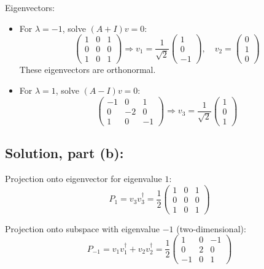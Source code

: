 \documentclass[12pt]{article}
\begin{document}
        Eigenvectors:
        \begin{itemize}
            \item For \(\lambda=-1\), solve \((A+I)v=0\):
        \[
        \begin{pmatrix}
        1 & 0 & 1\\[4pt]
        0 & 0 & 0\\[4pt]
        1 & 0 & 1
        \end{pmatrix}
        \Rightarrow v_1=\frac{1}{\sqrt{2}}\begin{pmatrix}1\\0\\-1\end{pmatrix},\quad v_2=\begin{pmatrix}0\\1\\0\end{pmatrix}
        \]
        These eigenvectors are orthonormal.
        
        \item For \(\lambda=1\), solve \((A-I)v=0\):
        \[
        \begin{pmatrix}
        -1 & 0 & 1\\[4pt]
        0 & -2 & 0\\[4pt]
        1 & 0 & -1
        \end{pmatrix}
        \Rightarrow v_3=\frac{1}{\sqrt{2}}\begin{pmatrix}1\\0\\1\end{pmatrix}
        \]
        \end{itemize}
        
    \subsection*{Solution, part (b):}
        Projection onto eigenvector for eigenvalue \(1\):
        \[
        P_{1}=v_3 v_3^\dagger=\frac{1}{2}\begin{pmatrix}1 & 0 & 1\\[4pt]0 & 0 & 0\\[4pt]1 & 0 & 1\end{pmatrix}
        \]
        
        Projection onto subspace with eigenvalue \(-1\) (two-dimensional):
        \[
        P_{-1}=v_1 v_1^\dagger+v_2 v_2^\dagger=\frac{1}{2}\begin{pmatrix}1 & 0 & -1\\[4pt]0 & 2 & 0\\[4pt]-1 & 0 & 1\end{pmatrix}
        \]
            
\end{document}
